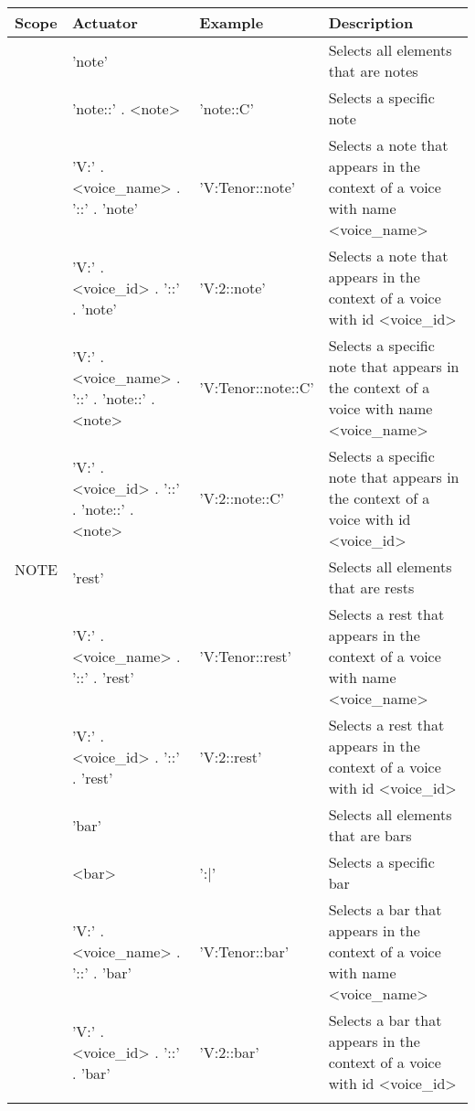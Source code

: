 \begin{center}
  \begin{tabular}{|p{1.75cm}|p{4cm}|p{3cm}|p{6cm}|}
    \hline
    Scope & Actuator & Example & Description \\
    \hline
    \hline
    \multirow{15}{*}{NOTE}
    & 'note'
    &
    & Selects all \abc{} elements that are notes
    \\ \cline{2-4}

    & 'note::' . <note>
    & 'note::C'
    & Selects a specific note
    \\ \cline{2-4}

    & 'V:' . <voice\_name> . '::' . 'note'
    & 'V:Tenor::note'
    & Selects a note that appears in the context of a voice with name <voice\_name>
    \\ \cline{2-4}

    & 'V:' . <voice\_id> . '::' . 'note'
    & 'V:2::note'
    & Selects a note that appears in the context of a voice with id <voice\_id>
    \\ \cline{2-4}

    & 'V:' . <voice\_name> . '::' . 'note::' . <note>
    & 'V:Tenor::note::C'
    & Selects a specific note that appears in the context of a voice with name <voice\_name>
    \\ \cline{2-4}

    & 'V:' . <voice\_id> . '::' . 'note::' . <note>
    & 'V:2::note::C'
    & Selects a specific note that appears in the context of a voice with id <voice\_id>
    \\ \cline{2-4}
    \hline

    \hline
    \multirow{8}{*}{REST}
    & 'rest'
    &
    & Selects all \abc{} elements that are rests
    \\ \cline{2-4}

    & 'V:' . <voice\_name> . '::' . 'rest'
    & 'V:Tenor::rest'
    & Selects a rest that appears in the context of a voice with name <voice\_name>
    \\ \cline{2-4}

    & 'V:' . <voice\_id> . '::' . 'rest'
    & 'V:2::rest'
    & Selects a rest that appears in the context of a voice with id <voice\_id>
    \\ \cline{2-4}
    \hline

    \hline
    \multirow{9}{*}{BAR}
    & 'bar'
    &
    & Selects all \abc{} elements that are bars
    \\ \cline{2-4}

    & <bar>
    & ':|'
    & Selects a specific bar
    \\ \cline{2-4}

    & 'V:' . <voice\_name> . '::' . 'bar'
    & 'V:Tenor::bar'
    & Selects a bar that appears in the context of a voice with name <voice\_name>
    \\ \cline{2-4}

    & 'V:' . <voice\_id> . '::' . 'bar'
    & 'V:2::bar'
    & Selects a bar that appears in the context of a voice with id <voice\_id>
    \\ \cline{2-4}
    \hline

  \end{tabular}
\end{center}

